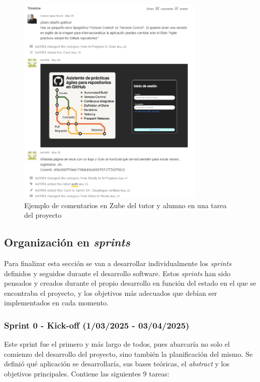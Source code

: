 \begin{figure}[H]
\centering
\includegraphics[width=0.8\textwidth]{img/ComentariosTareaZube.png}
\caption{Ejemplo de comentarios en Zube del tutor y alumno en una tarea del proyecto}
\label{fig:ComentariosTareaZube}
\end{figure}

\subsection{Organización en \textit{sprints}}

Para finalizar esta sección se van a desarrollar individualmente los \textit{sprints} definidos y seguidos durante el desarrollo software. Estos \textit{sprints} han sido pensados y creados durante el propio desarrollo en función del estado en el que se encontraba el proyecto, y los objetivos más adecuados que debían ser implementados en cada momento.

\subsubsection{Sprint 0 - Kick-off (1/03/2025 - 03/04/2025)}

Este sprint fue el primero y más largo de todos, pues abarcaría no solo el comienzo del desarrollo del proyecto, sino también la planificación del mismo. Se definió qué aplicación se desarrollaría, sus bases teóricas, el \textit{abstract} y los objetivos principales. Contiene las siguientes 9 tareas:

